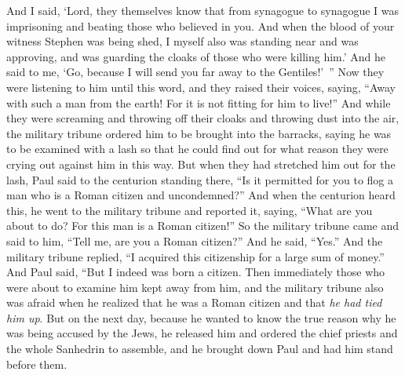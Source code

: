 \begin{biblechapter}
\verse And I said, ‘Lord, they themselves know that from synagogue to synagogue I was imprisoning and beating those who believed in you.
\verse And when the blood of your witness Stephen was being shed, I myself also was standing near and was approving, and was guarding the cloaks of those who were killing him.’
\verse And he said to me, ‘Go, because I will send you far away to the Gentiles!’ ”
 Now they were listening to him until this word, and they raised their voices, saying, “Away with such a man from the earth! For it is not fitting for him to live!”
\verse And while they were screaming and throwing off their cloaks and throwing dust into the air,
\verse the military tribune ordered him to be brought into the barracks, saying he was to be examined with a lash so that he could find out for what reason they were crying out against him in this way.
\verse But when they had stretched him out for the lash, Paul said to the centurion standing there, “Is it permitted for you to flog a man who is a Roman citizen and uncondemned?”
\verse And when the centurion heard this, he went to the military tribune and reported it, saying, “What are you about to do? For this man is a Roman citizen!”
\verse So the military tribune came and said to him, “Tell me, are you a Roman citizen?” And he said, “Yes.”
\verse And the military tribune replied, “I acquired this citizenship for a large sum of money.” And Paul said, “But I indeed was born a citizen.
\verse Then immediately those who were about to examine him kept away from him, and the military tribune also was afraid when he realized that he was a Roman citizen and that \textit{he had tied him up}.
\verse But on the next day, because he wanted to know the true reason why he was being accused by the Jews, he released him and ordered the chief priests and the whole Sanhedrin to assemble, and he brought down Paul and had him stand before them.
\end{biblechapter}

